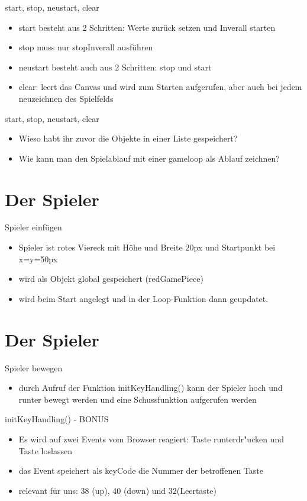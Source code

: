 \documentclass[18pt]{beamer}
\begin{document}
\begin{frame}{start, stop, neustart, clear}
\begin{itemize}
	\item start besteht aus 2 Schritten: Werte zurück setzen und Inverall starten
	\item stop muss nur stopInverall ausführen
	\item neustart besteht auch aus 2 Schritten: stop und start
	\item clear: leert das Canvas und wird zum Starten aufgerufen, aber auch bei jedem neuzeichnen des Spielfelds

\end{itemize}
\end{frame}

\begin{frame}{start, stop, neustart, clear}
\begin{itemize}
	\item Wieso habt ihr zuvor die Objekte in einer Liste gespeichert?
	\item Wie kann man den Spielablauf mit einer gameloop als Ablauf zeichnen?
	
\end{itemize}
\end{frame}


\section{Der Spieler}
\begin{frame}{Spieler einfügen}
\begin{itemize}
	\item Spieler ist rotes Viereck mit Höhe und Breite 20px und Startpunkt bei x=y=50px
	\item wird als Objekt global gespeichert (redGamePiece)
	\item wird beim Start angelegt und in der Loop-Funktion dann geupdatet.
\end{itemize}
\end{frame}

\section{Der Spieler}
\begin{frame}{Spieler bewegen}
\begin{itemize}
	\item durch Aufruf der Funktion initKeyHandling() kann der Spieler hoch und runter bewegt werden und eine Schussfunktion aufgerufen werden
\end{itemize}
\end{frame}
\begin{frame}{initKeyHandling() - BONUS}
\begin{itemize}
	\item Es wird auf zwei Events vom Browser reagiert: Taste runterdr"ucken und Taste loslassen
	\item das Event speichert als keyCode die Nummer der betroffenen Taste
	\item relevant für uns: 38 (up), 40 (down) und 32(Leertaste)
	
\end{itemize}
\end{frame}
\end{document}
